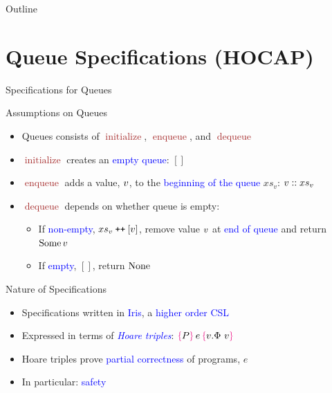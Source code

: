 \documentclass[9pt,xcolor={dvipsnames}]{beamer}
\newcommand{\initialise}{\operatorname{initialize}}
\newcommand{\enqueue}{\operatorname{enqueue}}
\newcommand{\dequeue}{\operatorname{dequeue}}
\newcommand{\absvalue}{\val}
\newcommand{\absvalueList}{xs_v}
\newcommand\catenate{\mathbin{\text{\ttfamily\upshape ++}}}
\begin{document}
\begin{frame}{Outline}
  \tableofcontents
\end{frame}


\section{Queue Specifications (HOCAP)}

\begin{frame}{Specifications for Queues}
  \begin{block}{Assumptions on Queues}
    \begin{itemize}
      \item Queues consists of \textcolor{Brown}{$\initialise$}, \textcolor{Brown}{$\enqueue$}, and \textcolor{Brown}{$\dequeue$}
      \item \textcolor{Brown}{$\initialise$} creates an \textcolor{blue}{empty queue}: $[]$
      \item \textcolor{Brown}{$\enqueue$} adds a value, $\absvalue$, to the \textcolor{blue}{beginning of the queue} $\absvalueList$: $\absvalue :: \absvalueList$
      \item \textcolor{Brown}{$\dequeue$} depends on whether queue is empty:
        \begin{itemize}
          \item If \textcolor{blue}{non-empty}, $\absvalueList \catenate [\absvalue]$, remove value $\absvalue$ at \textcolor{blue}{end of queue} and return \textcolor{blue}{$\Some \absvalue$}
          \item If \textcolor{blue}{empty}, $[]$, return \textcolor{blue}{$\operatorname{None}$}
        \end{itemize}
    \end{itemize}
  \end{block}
  \pause
  \begin{block}{Nature of Specifications}
    \begin{itemize}
      \item Specifications written in \textcolor{blue}{Iris}, a \textcolor{blue}{higher order CSL}
      \item Expressed in terms of \textcolor{blue}{\textit{Hoare triples}}: $\hoare{P}{e}{v. \Phi ~ v}$
      \item Hoare triples prove \textcolor{blue}{partial correctness} of programs, $e$
      \item In particular: \textcolor{blue}{safety}
    \end{itemize}
  \end{block}
\end{frame}
\end{document}

